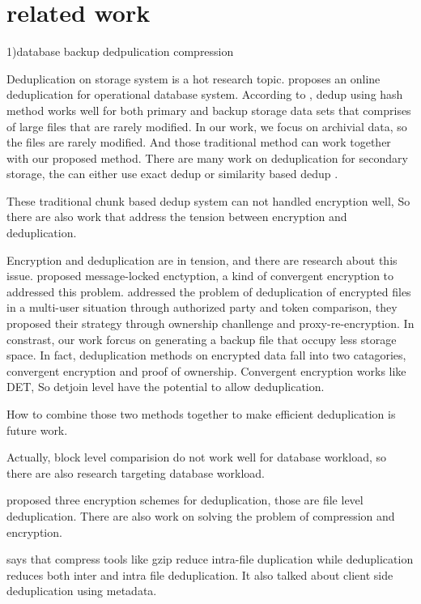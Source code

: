 \section{related work}

1)database backup dedpulication compression

Deduplication on storage system is a hot research topic\citep{paulo2014survey}.\citep{xu2017online} proposes an online deduplication for operational database system. According to \citep{xu2017online}, dedup using hash method works well for both primary and backup storage data sets that comprises of large files that are rarely modified. In our work, we focus on archivial data, so the files are rarely modified. And those traditional method can work together with our proposed method. There are many work on deduplication for secondary storage, the can either use exact dedup\citep{dubnicki2009hydrastor} or similarity based dedup\citep{xu2015reducing} \citep{aronovich2009design}\citep{you2005deep}.

These traditional chunk based dedup system can not handled encryption well, So there are also work that address the tension between encryption and deduplication. 

Encryption and deduplication are in tension, and there are research about this issue.\citep{bellare2013message} \citep{puzio2015perfectdedup} proposed message-locked enctyption, a kind of convergent encryption to addressed this problem. \citep{yan2016deduplication} addressed the problem of deduplication of encrypted files in a multi-user situation through authorized party and token comparison, they proposed their strategy through ownership chanllenge and proxy-re-encryption. In constrast, our work forcus on generating a backup file that occupy less storage space. In fact, deduplication methods on encrypted data fall into two catagories, convergent encryption and proof of ownership\citep{akhila2016study}. Convergent encryption works like DET, So detjoin level have the potential to allow deduplication.

How to combine those two methods together to make efficient deduplication is future work.

Actually, block level comparision do not work well for database workload, so there are also research targeting database workload. 

\citep{francinasurvey} proposed three encryption schemes for deduplication, those are file level deduplication.
There are also work on solving the problem of compression and encryption\citep{zheng2017minicrypt}.

\citep{mandagere2008demystifying} says that compress tools like gzip reduce intra-file duplication while deduplication reduces both inter and intra file deduplication. It also talked about client side deduplication using metadata.


